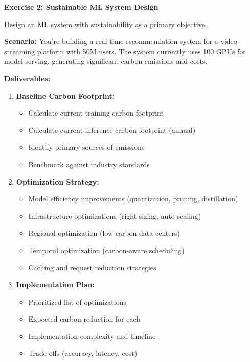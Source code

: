 \begin{exercise}
\textbf{Exercise 2: Sustainable ML System Design}

Design an ML system with sustainability as a primary objective.

\textbf{Scenario:}
You're building a real-time recommendation system for a video streaming platform with 50M users. The system currently uses 100 GPUs for model serving, generating significant carbon emissions and costs.

\textbf{Deliverables:}
\begin{enumerate}
    \item \textbf{Baseline Carbon Footprint:}
    \begin{itemize}
        \item Calculate current training carbon footprint
        \item Calculate current inference carbon footprint (annual)
        \item Identify primary sources of emissions
        \item Benchmark against industry standards
    \end{itemize}

    \item \textbf{Optimization Strategy:}
    \begin{itemize}
        \item Model efficiency improvements (quantization, pruning, distillation)
        \item Infrastructure optimizations (right-sizing, auto-scaling)
        \item Regional optimization (low-carbon data centers)
        \item Temporal optimization (carbon-aware scheduling)
        \item Caching and request reduction strategies
    \end{itemize}

    \item \textbf{Implementation Plan:}
    \begin{itemize}
        \item Prioritized list of optimizations
        \item Expected carbon reduction for each
        \item Implementation complexity and timeline
        \item Trade-offs (accuracy, latency, cost)
    \end{itemize}


\end{enumerate}
\end{exercise}
